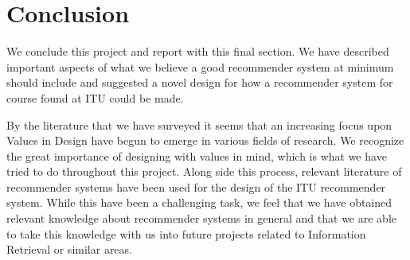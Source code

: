 \section{Conclusion}
We conclude this project and report with this final section. We have described important aspects of what we believe a good recommender system at minimum should include and suggested a novel design for how a recommender system for course found at ITU could be made.\newline

By the literature that we have surveyed it seems that an increasing focus upon Values in Design have begun to emerge in various fields of research. We recognize the great importance of designing with values in mind, which is what we have tried to do throughout this project. Along side this process, relevant literature of recommender systems have been used for the design of the ITU recommender system. While this have been a challenging task, we feel that we have obtained relevant knowledge about recommender systems in general and that we are able to take this knowledge with us into future projects related to Information Retrieval or similar areas.\newline



